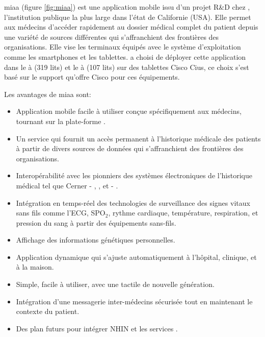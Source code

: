 \gls{miaa} (figure \ref{fig:miaa}) est une application mobile issu d'un
projet R\&D chez , l'institution publique la
plus large dans l'état de Californie (USA). Elle permet aux médecins
d'accéder rapidement au dossier médical complet du patient depuis une
variété de sources différentes qui s'affranchient des frontières des
organisations\cite{pph:eweek}. Elle vise les terminaux équipés avec le
système d'exploitation \android{} comme les smartphones et les
tablettes.  a choisi de déployer cette
application dans le  à  (319
lits) et le  à  (107 lits) sur des
tablettes Cisco Cius\cite{pph:tabtimes}, ce choix s'est basé sur le
support qu'offre Cisco pour ces équipements.

Les avantages de \gls{miaa} sont:~\cite{pph:yahoo}

\begin{itemize}

\item Application mobile facile à utiliser conçue spécifiquement aux
médecins, tournant sur la plate-forme \android{}.

\item Un service  qui fournit un accès permanent à
l'historique médicale des patients à partir de divers sources de
données qui s'affranchient des frontières des organisations.

\item Interopérabilité avec les pionniers des systèmes électroniques
de l'historique médical tel que Cerner - ,
, et  - .

\item Intégration en temps-réel des technologies de surveillance
des signes vitaux sans fils comme l'ECG, SPO$_{2}$, rythme cardiaque,
température, respiration, et pression du sang à partir des équipements
sans-fils.

\item Affichage des informations génétiques personnelles.

\item Application dynamique qui s’ajuste automatiquement à l’hôpital, clinique, et à la maison.

\item Simple, facile à utiliser, avec une tactile de nouvelle génération.

\item Intégration d’une messagerie inter-médecins sécurisée tout en maintenant le contexte du patient.

\item Des plan futurs pour intégrer NHIN  et les services
.

\end{itemize}

